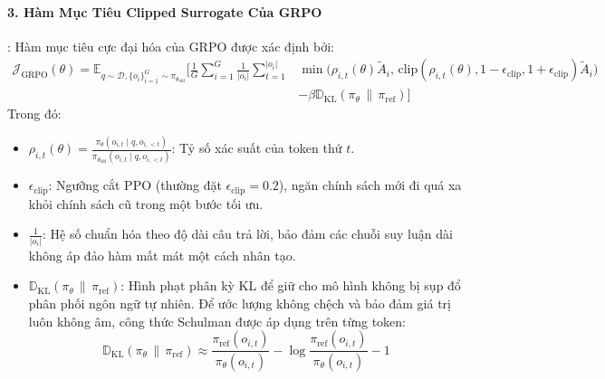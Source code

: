 \paragraph{3. Hàm Mục Tiêu Clipped Surrogate Của GRPO}:
Hàm mục tiêu cực đại hóa của GRPO được xác định bởi:
\begin{equation}
\label{eq:grpo-loss}
\begin{split}
\mathcal{J}_{\text{GRPO}}(\theta) = \mathbb{E}_{q \sim \mathcal{D}, \{o_i\}_{i=1}^G \sim \pi_{\theta_{\text{old}}}} \Bigg[ \frac{1}{G} \sum_{i=1}^G \frac{1}{|o_i|} \sum_{t=1}^{|o_i|} & \min\Big( \rho_{i,t}(\theta) \widetilde{A}_i, \, \text{clip}\left(\rho_{i,t}(\theta), 1 - \epsilon_{\text{clip}}, 1 + \epsilon_{\text{clip}}\right) \widetilde{A}_i \Big) \\
&- \beta \mathbb{D}_{\text{KL}}(\pi_\theta \,\|\, \pi_{\text{ref}}) \Bigg]
\end{split}
\end{equation}
Trong đó:
\begin{itemize}
  \item $\rho_{i,t}(\theta) = \frac{\pi_\theta(o_{i,t} \mid q, o_{i,<t})}{\pi_{\theta_{\text{old}}}(o_{i,t} \mid q, o_{i,<t})}$: Tỷ số xác suất của token thứ $t$.
  \item $\epsilon_{\text{clip}}$: Ngưỡng cắt PPO (thường đặt $\epsilon_{\text{clip}} = 0.2$), ngăn chính sách mới đi quá xa khỏi chính sách cũ trong một bước tối ưu.
  \item $\frac{1}{|o_i|}$: Hệ số chuẩn hóa theo độ dài câu trả lời, bảo đảm các chuỗi suy luận dài không áp đảo hàm mất mát một cách nhân tạo.
  \item $\mathbb{D}_{\text{KL}}(\pi_\theta \,\|\, \pi_{\text{ref}})$: Hình phạt phân kỳ KL để giữ cho mô hình không bị sụp đổ phân phối ngôn ngữ tự nhiên. Để ước lượng không chệch và bảo đảm giá trị luôn không âm, công thức Schulman được áp dụng trên từng token:
  \begin{equation}
  \mathbb{D}_{\text{KL}}(\pi_\theta \,\|\, \pi_{\text{ref}}) \approx \frac{\pi_{\text{ref}}(o_{i,t})}{\pi_\theta(o_{i,t})} - \log \frac{\pi_{\text{ref}}(o_{i,t})}{\pi_\theta(o_{i,t})} - 1
  \end{equation}
\end{itemize}

